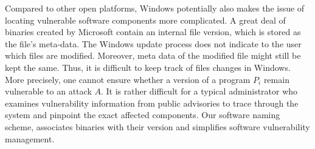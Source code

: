 Compared to other open platforms, Windows potentially also makes 
the issue of locating vulnerable software components more complicated. 
A great deal of binaries created by Microsoft contain an internal file version,
which is stored as the file's meta-data. The Windows update process does not
indicate to the user which files are modified. 
Moreover, meta data of the modified file might still be kept the same.
Thus, it is difficult to keep track of files changes in Windows.
More precisely, one cannot ensure whether a version of a program $P_i$ 
remain vulnerable to an attack $A$.
It is rather difficult for a typical administrator
who examines vulnerability information from public advisories
to trace through the system and pinpoint the exact affected components.
Our software naming scheme, associates binaries with
their version and simplifies software vulnerability management.
